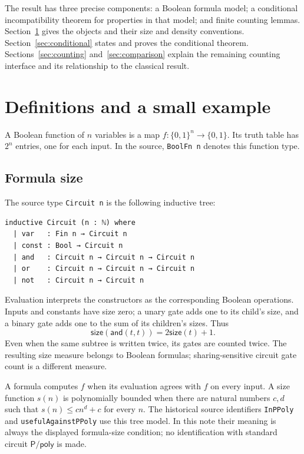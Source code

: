 \documentclass[11pt]{amsart}
\theoremstyle{plain}
\theoremstyle{definition}
\newcommand{\size}{\mathsf{size}}
\newcommand{\Ppoly}{\mathsf{P/poly}}
\begin{document}
The result has three precise components: a Boolean formula model;
a conditional incompatibility theorem for properties in that model;
and finite counting lemmas. Section~\ref{sec:definitions} gives the
objects and their size and density conventions.
Section~\ref{sec:conditional} states and proves the conditional theorem.
Sections~\ref{sec:counting} and~\ref{sec:comparison} explain the remaining
counting interface and its relationship to the classical result.

\section{Definitions and a small example}
\label{sec:definitions}

A Boolean function of $n$ variables is a map
$f:\{0,1\}^n\to\{0,1\}$. Its truth table has $2^n$ entries, one for
each input. In the source, \texttt{BoolFn n} denotes this function type.

\subsection{Formula size}

The source type \texttt{Circuit n} is the following inductive tree:
\begin{lstlisting}
inductive Circuit (n : ℕ) where
  | var   : Fin n → Circuit n
  | const : Bool → Circuit n
  | and   : Circuit n → Circuit n → Circuit n
  | or    : Circuit n → Circuit n → Circuit n
  | not   : Circuit n → Circuit n
\end{lstlisting}
Evaluation interprets the constructors as the corresponding Boolean
operations. Inputs and constants have size zero; a unary gate adds one
to its child's size, and a binary gate adds one to the sum of its
children's sizes. Thus
\[
 \size(\mathsf{and}(t,t))=2\size(t)+1.
\]
Even when the same subtree is written twice, its gates are counted
twice. The resulting size measure belongs to Boolean formulas;
sharing-sensitive circuit gate count is a different measure.

A formula computes $f$ when its evaluation agrees with $f$ on every
input. A size function $s(n)$ is polynomially bounded when there are
natural numbers $c,d$ such that
$s(n)\le c n^d+c$ for every $n$. The historical source identifiers
\texttt{InPPoly} and \texttt{usefulAgainstPPoly} use this tree model.
In this note their meaning is always the displayed formula-size
condition; no identification with standard circuit $\Ppoly$ is made.
\end{document}
